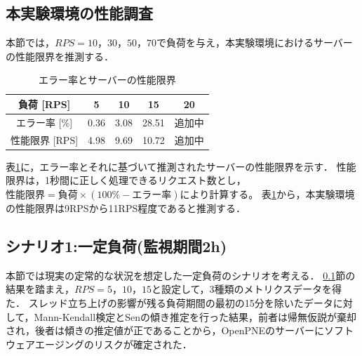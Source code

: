 \documentclass[twoside,twocolumn,10pt]{jarticle}  %
\begin{document}
\subsection{本実験環境の性能調査}
\label{subsec:limit}
本節では，$RPS=10，30，50，70$で負荷を与え，本実験環境におけるサーバーの性能限界を推測する．
\begin{table}[h]
  \vspace{-0.4cm}
  \centering
  \caption{エラー率とサーバーの性能限界}
  \label{tab:rps}
  \begin{tabular}{ccccc}
    \hline \hline
    負荷 [RPS] & 5 & 10 & 15 & 20 \\ \hline %
    エラー率 [\%] & 0.36 & 3.08 & 28.51 & 追加中 \\ \hline
    性能限界 [RPS] & 4.98 & 9.69 & 10.72 & 追加中 \\ \hline
  \end{tabular}
  \vspace{-0.3cm}
\end{table}

表\ref{tab:rps}に，エラー率とそれに基づいて推測されたサーバーの性能限界を示す．
性能限界は，1秒間に正しく処理できるリクエスト数とし，$性能限界=負荷\times(100\%-エラー率)$により計算する。
表\ref{tab:rps}から，本実験環境の性能限界は9RPSから11RPS程度であると推測する．

\subsection{シナリオ1:一定負荷(監視期間2h)}\label{subsec:load1}

本節では現実の定常的な状況を想定した一定負荷のシナリオを考える．
\ref{subsec:limit}節の結果を踏まえ，$RPS=5，10，15$と設定して，3種類のメトリクスデータを得た．
スレッド立ち上げの影響が残る負荷期間の最初の15分を除いたデータに対して，Mann-Kendall検定\cite{Mann1945Nonparametric}とSenの傾き推定\cite{Sen1968Estimates}を行った結果，前者は帰無仮説が棄却され，後者は傾きの推定値が正であることから，OpenPNEのサーバーにソフトウェアエージングのリスクが確定された．
\end{document}
